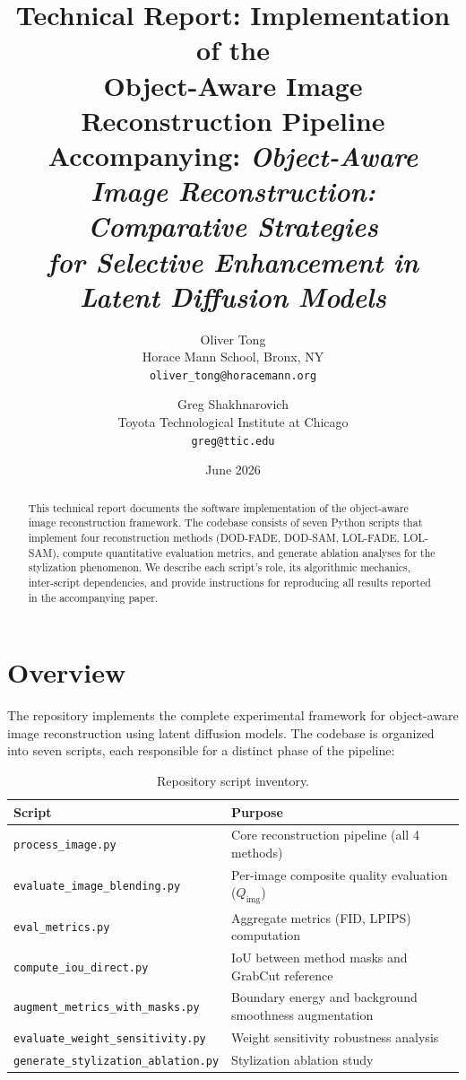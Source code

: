 \documentclass[11pt,a4paper]{article}
\title{\textbf{Technical Report: Implementation of the\\Object-Aware Image Reconstruction Pipeline}\\[12pt]
\large Accompanying: \textit{Object-Aware Image Reconstruction: Comparative Strategies\\for Selective Enhancement in Latent Diffusion Models}}
\author{
  Oliver Tong\\
  \small Horace Mann School, Bronx, NY\\
  \small \texttt{oliver\_tong@horacemann.org}
  \and
  Greg Shakhnarovich\\
  \small Toyota Technological Institute at Chicago\\
  \small \texttt{greg@ttic.edu}
}
\date{June 2026}
\begin{document}
\maketitle

\begin{abstract}
This technical report documents the software implementation of the object-aware image reconstruction framework. The codebase consists of seven Python scripts that implement four reconstruction methods (DOD-FADE, DOD-SAM, LOL-FADE, LOL-SAM), compute quantitative evaluation metrics, and generate ablation analyses for the stylization phenomenon. We describe each script's role, its algorithmic mechanics, inter-script dependencies, and provide instructions for reproducing all results reported in the accompanying paper.
\end{abstract}

\tableofcontents
\newpage

\section{Overview}

The repository implements the complete experimental framework for object-aware image reconstruction using latent diffusion models. The codebase is organized into seven scripts, each responsible for a distinct phase of the pipeline:

\begin{table}[h]
\centering
\small
\caption{Repository script inventory.}
\label{tab:scripts}
\begin{tabularx}{\textwidth}{lX}
\toprule
\textbf{Script} & \textbf{Purpose} \\
\midrule
\texttt{process\_image.py} & Core reconstruction pipeline (all 4 methods) \\
\texttt{evaluate\_image\_blending.py} & Per-image composite quality evaluation ($Q_{\text{img}}$) \\
\texttt{eval\_metrics.py} & Aggregate metrics (FID, LPIPS) computation \\
\texttt{compute\_iou\_direct.py} & IoU between method masks and GrabCut reference \\
\texttt{augment\_metrics\_with\_masks.py} & Boundary energy and background smoothness augmentation \\
\texttt{evaluate\_weight\_sensitivity.py} & Weight sensitivity robustness analysis \\
\texttt{generate\_stylization\_ablation.py} & Stylization ablation study \\
\bottomrule
\end{tabularx}
\end{table}
\end{document}
